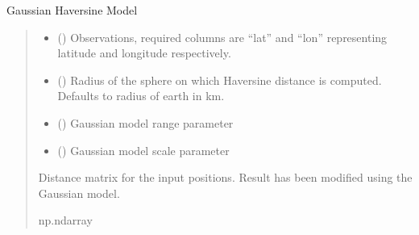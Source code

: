 \documentclass[letterpaper,10pt,english]{sphinxmanual}
\begin{document}
\begin{fulllineitems}
\label{\detokenize{misc:glomar_gridding.distances.haversine_gaussian}}
\pysigstartsignatures
\pysiglinewithargsret
{}
{\sphinxparamcomma {}\sphinxparamcomma {}\sphinxparamcomma {}}
{}
\pysigstopsignatures
\sphinxAtStartPar
Gaussian Haversine Model
\begin{quote}\begin{description}
\begin{itemize}
\item {}
\sphinxAtStartPar
{} () \textendash{} Observations, required columns are “lat” and “lon” representing
latitude and longitude respectively.

\item {}
\sphinxAtStartPar
{} () \textendash{} Radius of the sphere on which Haversine distance is computed. Defaults
to radius of earth in km.

\item {}
\sphinxAtStartPar
{} () \textendash{} Gaussian model range parameter

\item {}
\sphinxAtStartPar
{} () \textendash{} Gaussian model scale parameter

\end{itemize}

\sphinxAtStartPar
{} \textendash{} Distance matrix for the input positions. Result has been modified using
the Gaussian model.

\sphinxAtStartPar
np.ndarray

\end{description}\end{quote}

\end{fulllineitems}
\end{document}
